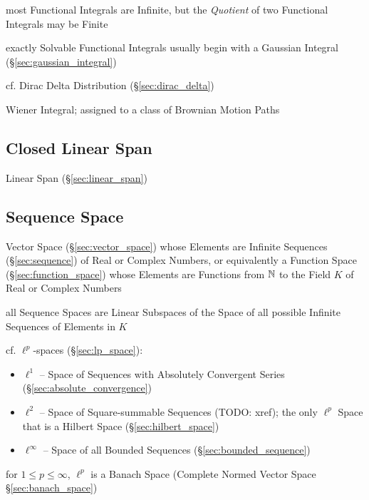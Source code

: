 most Functional Integrals are Infinite, but the \emph{Quotient} of two
Functional Integrals may be Finite

exactly Solvable Functional Integrals usually begin with a Gaussian Integral
(\S\ref{sec:gaussian_integral})

cf. Dirac Delta Distribution (\S\ref{sec:dirac_delta})

Wiener Integral; assigned to a class of Brownian Motion Paths



\subsection{Closed Linear Span}\label{sec:closed_linear_span}

Linear Span (\S\ref{sec:linear_span})



\subsection{Sequence Space}\label{sec:sequence_space}

Vector Space (\S\ref{sec:vector_space}) whose Elements are Infinite Sequences
(\S\ref{sec:sequence}) of Real or Complex Numbers, or equivalently a Function
Space (\S\ref{sec:function_space}) whose Elements are Functions from $\mathbb{N}$ to
the Field $K$ of Real or Complex Numbers

all Sequence Spaces are Linear Subspaces of the Space of all possible Infinite
Sequences of Elements in $K$

\fist cf. $\ell^p$-spaces (\S\ref{sec:lp_space}):
\begin{itemize}
  \item $\ell^1$ -- Space of Sequences with Absolutely Convergent Series
    (\S\ref{sec:absolute_convergence})
  \item $\ell^2$ -- Space of Square-summable Sequences (TODO: xref); the only
    $\ell^p$ Space that is a Hilbert Space (\S\ref{sec:hilbert_space})
  \item $\ell^\infty$ -- Space of all Bounded Sequences
    (\S\ref{sec:bounded_sequence})
\end{itemize}
for $1 \leq p \leq \infty$, $\ell^p$ is a Banach Space (Complete Normed Vector
Space \S\ref{sec:banach_space})



